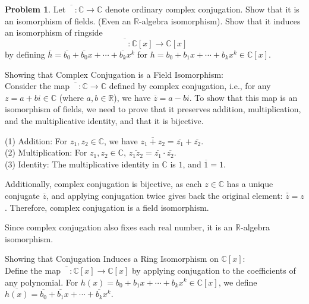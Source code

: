 \documentclass[12pt]{article}
\theoremstyle{definition}
\newtheorem{problem}{Problem}
\begin{document}
\begin{problem}
    Let $\overline{\phantom{O}}: \mathbb{C} \longrightarrow \mathbb{C}$ denote ordinary complex conjugation. Show that it is an isomorphism
    of fields. (Even an $\mathbb{R}$-algebra isomorphism). Show that it induces an isomorphism of ringside
    \[
        \overline{\phantom{O}}: \mathbb{C}[x] \longrightarrow \mathbb{C}[x]
    \]
    by defining $\overline{h} = \overline{b_0} + \overline{b_0}x + \cdots + \overline{b_k}x^k$ for $h = b_0 + b_1x + \cdots + b_kx^k \in \mathbb{C}[x]$.

    \begin{solution}
        Showing that Complex Conjugation is a Field Isomorphism:\\
        Consider the map \(\overline{\phantom{O}} : \mathbb{C} \rightarrow \mathbb{C}\) defined by complex conjugation, i.e., for any \( z = a + bi \in \mathbb{C} \) (where \( a, b \in \mathbb{R} \)), we have \( \overline{z} = a - bi \). To show that this map is an isomorphism of fields, we need to prove that it preserves addition, multiplication, and the multiplicative identity, and that it is bijective.

        (1) Addition: For \( z_1, z_2 \in \mathbb{C} \), we have \(\overline{z_1 + z_2} = \overline{z_1} + \overline{z_2}\).\\
        (2) Multiplication: For \( z_1, z_2 \in \mathbb{C} \), \(\overline{z_1 z_2} = \overline{z_1} \cdot \overline{z_2}\).\\
        (3) Identity: The multiplicative identity in \( \mathbb{C} \) is \( 1 \), and \(\overline{1} = 1\).

        Additionally, complex conjugation is bijective, as each \( z \in \mathbb{C} \) has a unique conjugate \( \overline{z} \), and applying conjugation twice gives back the original element: \( \overline{\overline{z}} = z \). Therefore, complex conjugation is a field isomorphism.

        Since complex conjugation also fixes each real number, it is an \( \mathbb{R} \)-algebra isomorphism.

        Showing that Conjugation Induces a Ring Isomorphism on \( \mathbb{C}[x] \):\\
        Define the map \(\overline{\phantom{O}} : \mathbb{C}[x] \rightarrow \mathbb{C}[x]\) by applying conjugation to the coefficients of any polynomial. For \( h(x) = b_0 + b_1 x + \cdots + b_k x^k \in \mathbb{C}[x] \), we define \(\overline{h(x)} = \overline{b_0} + \overline{b_1} x + \cdots + \overline{b_k} x^k\).


\end{solution}
\end{problem}
\end{document}

